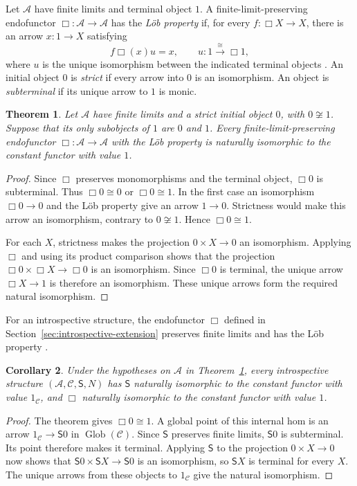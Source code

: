 \documentclass[11pt]{article}
\newtheorem{theorem}{Theorem}[section]
\newtheorem{corollary}[theorem]{Corollary}
\theoremstyle{definition}
\theoremstyle{remark}
\begin{document}
Let $\mathcal A$ have finite limits and terminal object $1$.
A finite-limit-preserving endofunctor $\Box:\mathcal A\to\mathcal A$
has the \emph{L\"ob property} if, for every
$f:\Box X\to X$, there is an arrow $x:1\to X$ satisfying
\[
 f\Box(x)u=x,
 \qquad u:1\xrightarrow{\cong}\Box1,
\]
where $u$ is the unique isomorphism between the indicated terminal
objects \cite[Definition~4.1]{Ramesh}.
An initial object $0$ is \emph{strict} if every arrow into $0$
is an isomorphism. An object is \emph{subterminal} if its unique
arrow to $1$ is monic.

\begin{theorem}\label{thm:two-valued-lob-collapse}
Let $\mathcal A$ have finite limits and a strict initial object
$0$, with $0\not\cong1$. Suppose that its only subobjects of
$1$ are $0$ and $1$. Every finite-limit-preserving endofunctor
$\Box:\mathcal A\to\mathcal A$ with the L\"ob property is
naturally isomorphic to the constant functor with value $1$.
\end{theorem}
\begin{proof}
Since $\Box$ preserves monomorphisms and the terminal object,
$\Box0$ is subterminal. Thus $\Box0\cong0$ or $\Box0\cong1$.
In the first case an isomorphism $\Box0\to0$ and the L\"ob
property give an arrow $1\to0$. Strictness would make this
arrow an isomorphism, contrary to $0\not\cong1$.
Hence $\Box0\cong1$.

For each $X$, strictness makes the projection $0\times X\to0$
an isomorphism. Applying $\Box$ and using its product comparison
shows that the projection
$\Box0\times\Box X\longrightarrow\Box0$
is an isomorphism. Since $\Box0$ is terminal, the unique arrow
$\Box X\to1$ is therefore an isomorphism. These unique arrows
form the required natural isomorphism.
\end{proof}

For an introspective structure, the endofunctor $\Box$ defined
in Section~\ref{sec:introspective-extension} preserves finite limits
\cite[Definition~3.2]{Ramesh} and has the L\"ob property
\cite[Theorem~4.19 and Corollary~4.21]{Ramesh}.

\begin{corollary}\label{cor:two-valued-introspection-collapse}
Under the hypotheses on $\mathcal A$ in
Theorem~\ref{thm:two-valued-lob-collapse}, every introspective
structure $(\mathcal A,\mathcal C,\mathsf S,N)$ has
$\mathsf S$ naturally isomorphic to the constant functor
with value $1_{\mathcal C}$, and $\Box$ naturally isomorphic
to the constant functor with value $1$.
\end{corollary}
\begin{proof}
The theorem gives $\Box0\cong1$. A global point of this
internal hom is an arrow $1_{\mathcal C}\to \mathsf S0$ in
$\operatorname{Glob}(\mathcal C)$. Since $\mathsf S$ preserves finite
limits, $\mathsf S0$ is subterminal. Its point therefore makes it
terminal. Applying $\mathsf S$ to the projection $0\times X\to0$
now shows that $\mathsf S0\times \mathsf SX\to \mathsf S0$ is an isomorphism, so
$\mathsf SX$ is terminal for every $X$. The unique arrows from these
objects to $1_{\mathcal C}$ give the natural isomorphism.
\end{proof}
\end{document}
